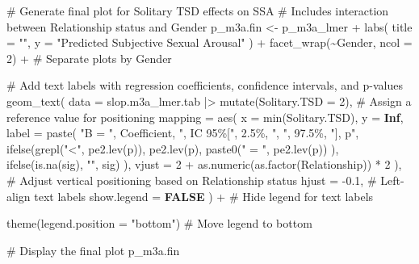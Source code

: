 \documentclass[
  bookmarksnumbered]{article}
\newenvironment{Shaded}{\begin{snugshade}}{\end{snugshade}}
\newcommand{\AttributeTok}[1]{\textcolor[rgb]{0.80,0.80,0.80}{#1}}
\newcommand{\CommentTok}[1]{\textcolor[rgb]{0.50,0.62,0.50}{#1}}
\newcommand{\ConstantTok}[1]{\textcolor[rgb]{0.86,0.64,0.64}{\textbf{#1}}}
\newcommand{\DecValTok}[1]{\textcolor[rgb]{0.86,0.86,0.80}{#1}}
\newcommand{\FloatTok}[1]{\textcolor[rgb]{0.75,0.75,0.82}{#1}}
\newcommand{\FunctionTok}[1]{\textcolor[rgb]{0.94,0.94,0.56}{#1}}
\newcommand{\NormalTok}[1]{\textcolor[rgb]{0.80,0.80,0.80}{#1}}
\newcommand{\OtherTok}[1]{\textcolor[rgb]{0.94,0.94,0.56}{#1}}
\newcommand{\SpecialCharTok}[1]{\textcolor[rgb]{0.86,0.64,0.64}{#1}}
\newcommand{\StringTok}[1]{\textcolor[rgb]{0.80,0.58,0.58}{#1}}
\begin{document}
\begin{Shaded}
\begin{Highlighting}[]
\CommentTok{\# Generate final plot for Solitary TSD effects on SSA}
\CommentTok{\# Includes interaction between Relationship status and Gender}
\NormalTok{p\_m3a.fin }\OtherTok{\textless{}{-}}\NormalTok{ p\_m3a\_lmer }\SpecialCharTok{+}
  \FunctionTok{labs}\NormalTok{(}
    \AttributeTok{title =} \StringTok{""}\NormalTok{,}
    \AttributeTok{y =} \StringTok{"Predicted Subjective Sexual Arousal"}
\NormalTok{  ) }\SpecialCharTok{+}
  \FunctionTok{facet\_wrap}\NormalTok{(}\SpecialCharTok{\textasciitilde{}}\NormalTok{Gender, }\AttributeTok{ncol =} \DecValTok{2}\NormalTok{) }\SpecialCharTok{+} \CommentTok{\# Separate plots by Gender}

  \CommentTok{\# Add text labels with regression coefficients, confidence intervals, and p{-}values}
  \FunctionTok{geom\_text}\NormalTok{(}
    \AttributeTok{data =}\NormalTok{ slop.m3a\_lmer.tab }\SpecialCharTok{|\textgreater{}}
      \FunctionTok{mutate}\NormalTok{(}\AttributeTok{Solitary.TSD =} \DecValTok{2}\NormalTok{), }\CommentTok{\# Assign a reference value for positioning}
    \AttributeTok{mapping =} \FunctionTok{aes}\NormalTok{(}
      \AttributeTok{x =} \FunctionTok{min}\NormalTok{(Solitary.TSD), }\AttributeTok{y =} \ConstantTok{Inf}\NormalTok{,}
      \AttributeTok{label =} \FunctionTok{paste}\NormalTok{(}
        \StringTok{"B = "}\NormalTok{, Coefficient,}
        \StringTok{", IC 95\%["}\NormalTok{, }\StringTok{\textasciigrave{}}\AttributeTok{2.5\%}\StringTok{\textasciigrave{}}\NormalTok{, }\StringTok{", "}\NormalTok{, }\StringTok{\textasciigrave{}}\AttributeTok{97.5\%}\StringTok{\textasciigrave{}}\NormalTok{,}
        \StringTok{"], p"}\NormalTok{,}
        \FunctionTok{ifelse}\NormalTok{(}\FunctionTok{grepl}\NormalTok{(}\StringTok{"\textless{}"}\NormalTok{, }\FunctionTok{pe2.lev}\NormalTok{(p)), }\FunctionTok{pe2.lev}\NormalTok{(p),}
          \FunctionTok{paste0}\NormalTok{(}\StringTok{" = "}\NormalTok{, }\FunctionTok{pe2.lev}\NormalTok{(p))}
\NormalTok{        ),}
        \FunctionTok{ifelse}\NormalTok{(}\FunctionTok{is.na}\NormalTok{(sig), }\StringTok{""}\NormalTok{, sig)}
\NormalTok{      ),}
      \AttributeTok{vjust =} \DecValTok{2} \SpecialCharTok{+} \FunctionTok{as.numeric}\NormalTok{(}\FunctionTok{as.factor}\NormalTok{(Relationship)) }\SpecialCharTok{*} \DecValTok{2}
\NormalTok{    ),}
    \CommentTok{\# Adjust vertical positioning based on Relationship status}
    \AttributeTok{hjust =} \SpecialCharTok{{-}}\FloatTok{0.1}\NormalTok{, }\CommentTok{\# Left{-}align text labels}
    \AttributeTok{show.legend =} \ConstantTok{FALSE}
\NormalTok{  ) }\SpecialCharTok{+} \CommentTok{\# Hide legend for text labels}

  \FunctionTok{theme}\NormalTok{(}\AttributeTok{legend.position =} \StringTok{"bottom"}\NormalTok{) }\CommentTok{\# Move legend to bottom}

\CommentTok{\# Display the final plot}
\NormalTok{p\_m3a.fin}
\end{Highlighting}
\end{Shaded}
\end{document}
